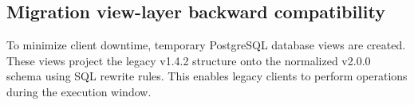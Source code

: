 \subsection{Migration view-layer backward compatibility}
To minimize client downtime, temporary PostgreSQL database views are created. These views project the legacy v1.4.2 structure onto the normalized v2.0.0 schema using SQL rewrite rules. This enables legacy clients to perform operations during the execution window.
